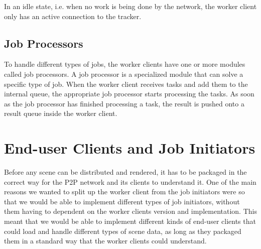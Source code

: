 In an idle state, i.e. when no work is being done by the network, the worker client only has an active connection to the tracker.






\subsection{Job Processors}
  To handle different types of jobs, the worker clients have one or more modules called job processors. A job processor is a specialized module that can solve a specific type of job. When the worker client receives tasks and add them to the internal queue, the appropriate job processor starts processing the tasks. As soon as the job processor has finished processing a task, the result is pushed onto a result queue inside the worker client.

\section{End-user Clients and Job Initiators}
Before any scene can be distributed and rendered, it has to be packaged in the correct way for the P2P network and its clients to understand it. One of the main reasons we wanted to split up the worker client from the job initiators were so that we would be able to implement different types of job initiators, without them having to dependent on the worker clients version and implementation. This meant that we would be able to implement different kinds of end-user clients that could load and handle different types of scene data, as long as they packaged them in a standard way that the worker clients could understand.

